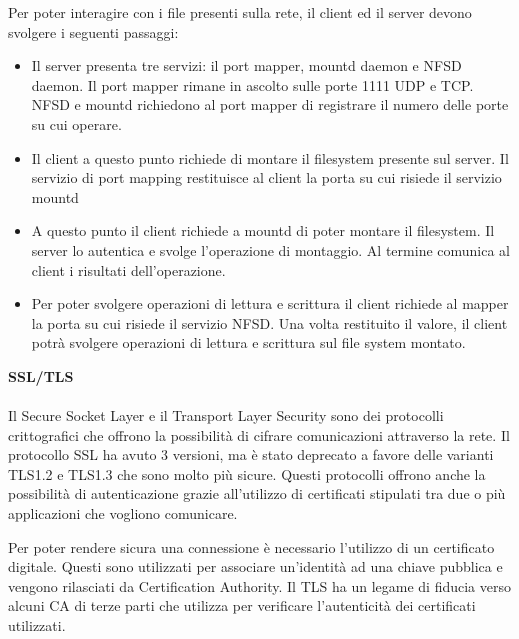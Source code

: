 \documentclass[12pt]{report}
\begin{document}
Per poter interagire con i file presenti sulla rete, il client ed il server devono svolgere i seguenti passaggi:\cite{eventhelixNFS}
\begin{itemize}
    \item Il server presenta tre servizi: il port mapper, mountd daemon e NFSD daemon. Il port mapper rimane in ascolto sulle porte 1111 UDP e TCP. NFSD e mountd richiedono al port mapper di registrare il numero delle porte su cui operare.
    \item Il client a questo punto richiede di montare il filesystem presente sul server. Il servizio di port mapping restituisce al client la porta su cui risiede il servizio mountd
    \item A questo punto il client richiede a mountd di poter montare il filesystem. Il server lo autentica e svolge l'operazione di montaggio. Al termine comunica al client i risultati dell'operazione. 
    \item Per poter svolgere operazioni di lettura e scrittura il client richiede al mapper la porta su cui risiede il servizio NFSD. Una volta restituito il valore, il client potrà svolgere operazioni di lettura e scrittura sul file system montato.
\end{itemize}

\noindent
\textbf{SSL/TLS}
\\\\
Il Secure Socket Layer e il Transport Layer Security sono dei protocolli crittografici che offrono la possibilità di cifrare comunicazioni attraverso la rete.\cite{rfcTLS} Il protocollo SSL ha avuto 3 versioni, ma è stato deprecato a favore delle varianti TLS1.2 e TLS1.3 che sono molto più sicure.\cite{rfcSSLDEP} Questi protocolli offrono anche la possibilità di autenticazione grazie all'utilizzo di certificati stipulati tra due o più applicazioni che vogliono comunicare.

Per poter rendere sicura una connessione è necessario l'utilizzo di un certificato digitale. Questi sono utilizzati per associare un'identità ad una chiave pubblica e vengono rilasciati da Certification Authority. Il TLS ha un legame di fiducia verso alcuni CA di terze parti che utilizza per verificare l'autenticità dei certificati utilizzati.\cite{ChadwickDavidW2001ETia}
\end{document}
